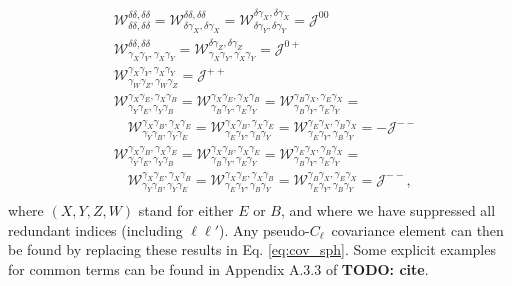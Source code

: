 \documentclass[a4paper,11pt]{article}
\newcommand{\todo}[1]{{\bf TODO: #1}}
\newcommand{\PCL}{pseudo-$C_\ell$~}
\begin{document}
        \begin{align}
          &\mathcal{W}^{\delta  \delta  ,\delta  \delta  }_{\delta  \delta  ,\delta  \delta  }=
           \mathcal{W}^{\delta  \delta  ,\delta  \delta  }_{\delta  \gamma_X,\delta  \gamma_X}=
           \mathcal{W}^{\delta  \gamma_X,\delta  \gamma_X}_{\delta  \gamma_Y,\delta  \gamma_Y}=\mathcal{J}^{00}\\
          &\mathcal{W}^{\delta  \delta  ,\delta  \delta  }_{\gamma_X\gamma_Y,\gamma_X\gamma_Y}=
           \mathcal{W}^{\delta  \gamma_Z,\delta  \gamma_Z}_{\gamma_X\gamma_Y,\gamma_X\gamma_Y}=\mathcal{J}^{0+}\\
          &\mathcal{W}^{\gamma_X\gamma_Y,\gamma_X\gamma_Y}_{\gamma_W\gamma_Z,\gamma_W\gamma_Z}=\mathcal{J}^{++}\\
          &\mathcal{W}^{\gamma_X\gamma_E,\gamma_X\gamma_B}_{\gamma_Y\gamma_E,\gamma_Y\gamma_B}=
           \mathcal{W}^{\gamma_X\gamma_E,\gamma_X\gamma_B}_{\gamma_B\gamma_Y,\gamma_E\gamma_Y}=
           \mathcal{W}^{\gamma_B\gamma_X,\gamma_E\gamma_X}_{\gamma_B\gamma_Y,\gamma_E\gamma_Y}=\\
          &\hspace{12pt}
           \mathcal{W}^{\gamma_X\gamma_B,\gamma_X\gamma_E}_{\gamma_Y\gamma_B,\gamma_Y\gamma_E}=
           \mathcal{W}^{\gamma_X\gamma_B,\gamma_X\gamma_E}_{\gamma_E\gamma_Y,\gamma_B\gamma_Y}=
           \mathcal{W}^{\gamma_E\gamma_X,\gamma_B\gamma_X}_{\gamma_E\gamma_Y,\gamma_B\gamma_Y}=-\mathcal{J}^{--}\\
          &\mathcal{W}^{\gamma_X\gamma_B,\gamma_X\gamma_E}_{\gamma_Y\gamma_E,\gamma_Y\gamma_B}=
           \mathcal{W}^{\gamma_X\gamma_B,\gamma_X\gamma_E}_{\gamma_B\gamma_Y,\gamma_E\gamma_Y}=
           \mathcal{W}^{\gamma_E\gamma_X,\gamma_B\gamma_X}_{\gamma_B\gamma_Y,\gamma_E\gamma_Y}=\\
          &\hspace{12pt}
           \mathcal{W}^{\gamma_X\gamma_E,\gamma_X\gamma_B}_{\gamma_Y\gamma_B,\gamma_Y\gamma_E}=
           \mathcal{W}^{\gamma_X\gamma_E,\gamma_X\gamma_B}_{\gamma_E\gamma_Y,\gamma_B\gamma_Y}=
           \mathcal{W}^{\gamma_B\gamma_X,\gamma_E\gamma_X}_{\gamma_E\gamma_Y,\gamma_B\gamma_Y}=\mathcal{J}^{--},\\
        \end{align}
        where $(X,Y,Z,W)$ stand for either $E$ or $B$, and where we have suppressed all redundant indices (including $\ell\ell'$). Any \PCL covariance element can then be found by replacing these results in Eq. \ref{eq:cov_sph}. Some explicit examples for common terms can be found in Appendix A.3.3 of \todo{cite}.
\end{document}
